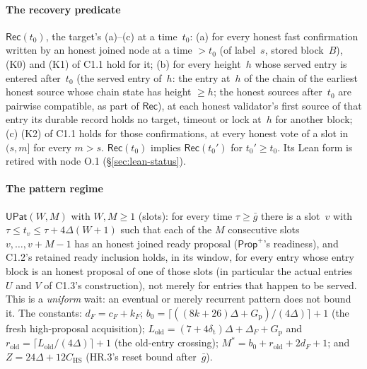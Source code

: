 \documentclass{article}
\newcommand{\cF}{c_F}
\begin{document}
\paragraph{The recovery predicate} $\mathsf{Rec}(t_0)$, the target's (a)--(c)
at a time~$t_0$: (a) for every honest fast confirmation written by an honest
joined node at a time $>t_0$ (of label~$s$, stored block~$B$),
(K0) and (K1) of C1.1 hold for it; (b) for every height~$h$ whose served entry
is entered after~$t_0$ (the served entry of~$h$: the entry at~$h$ of the chain
of the earliest honest source whose chain state has height
$\geq h$; the honest sources after~$t_0$ are pairwise compatible, as part of
$\mathsf{Rec}$), at each honest validator's first source of that entry its
durable record holds no target, timeout or lock at~$h$ for another block;
(c) (K2) of C1.1 holds for those confirmations, at every honest vote of a slot
in $(s,m]$ for every $m>s$.  $\mathsf{Rec}(t_0)$ implies
$\mathsf{Rec}(t_0')$ for $t_0'\geq t_0$.  Its Lean form is retired with
node O.1 (\S\ref{sec:lean-status}).

\paragraph{The pattern regime} $\mathsf{UPat}(W,M)$ with $W,M\geq1$ (slots):
for every time $\tau\geq\bar g$ there is a slot~$v$ with
$\tau\leq t_v\leq\tau+4\Delta(W+1)$ such that each of the $M$ consecutive
slots $v,\dots,v+M-1$ has an honest joined ready proposal
($\mathsf{Prop}^{+}$'s readiness), and C1.2's retained ready inclusion holds,
in its window, for every entry whose entry block is an honest proposal of one
of those slots (in particular the actual entries $U$ and $V$ of C1.3's
construction), not merely for entries that happen to be served.  This is a \emph{uniform} wait: an eventual
or merely recurrent pattern does not bound it.  The constants: $d_F=\cF+k_F$;
$b_0=\lceil((8k+26)\Delta+G_{\mathrm p})/(4\Delta)\rceil+1$ (the fresh
high-proposal acquisition);
$L_{\mathrm{old}}=(7+4\delta_{\mathrm t})\Delta+\Delta_F+G_{\mathrm p}$ and
$r_{\mathrm{old}}=\lceil L_{\mathrm{old}}/(4\Delta)\rceil+1$ (the old-entry
crossing); $M^*=b_0+r_{\mathrm{old}}+2d_F+1$; and
$Z=24\Delta+12C_{\mathrm{HS}}$ (HR.3's reset bound after~$\bar g$).
\end{document}
